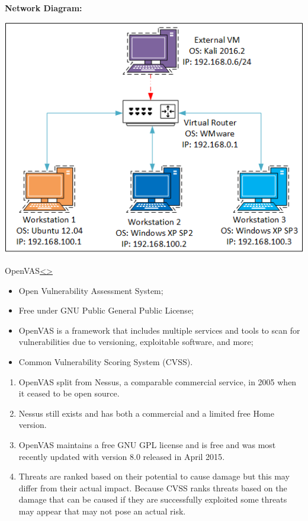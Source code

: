 \documentclass[12pt]{extarticle}
\newenvironment{instructionblock}{\Large\bgroup}{\egroup}
\begin{document}
\textbf{Network Diagram:}

\begin{center}
	\includegraphics{NetworkDiagram.png}
\end{center}


\pagebreak
\begin{slide}{OpenVAS}{\hyperref[slide 3]{\textless}\hyperref[slide 5]{\textgreater}}
	\begin{instructionblock}
		\begin{itemize}
			\item Open Vulnerability Assessment System;
			\item Free under GNU Public General Public License;
			\item OpenVAS is a framework that includes multiple services and tools to scan for vulnerabilities due to versioning, exploitable software, and more;
			\item Common Vulnerability Scoring System (CVSS).
		\end{itemize}
	\end{instructionblock}
\end{slide}
\begin{enumerate}
	\item OpenVAS split from Nessus, a comparable commercial service, in 2005 when it ceased to be open source.
	\item Nessus still exists and has both a commercial and a limited free Home version.
	\item OpenVAS maintains a free GNU GPL license and is free and was most recently updated with version 8.0 released in April 2015\cite{b3}.
	\item Threats are ranked based on their potential to cause damage but this may differ from their actual impact. Because CVSS ranks threats based on the damage that can be caused if they are successfully exploited some threats may appear that may not pose an actual risk\cite{b1}.
\end{enumerate}
\pagebreak
\end{document}
